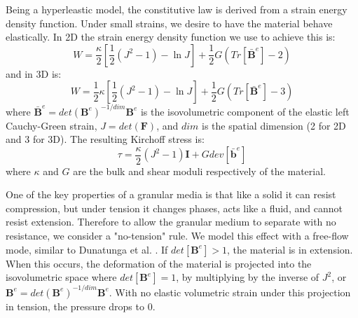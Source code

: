 Being a hyperleastic model, the constitutive law is derived from a strain energy density function.
Under small strains, we desire to have the material behave elastically. In 2D the strain energy density function we use to achieve this is:
\begin{equation}
W = \frac{\kappa}{2} \left[ \frac{1}{2} ( J^2 - 1 ) - \ln J \right] + \frac{1}{2} G ( Tr[ \bar{\bm{B}}^e ] - 2 )
\end{equation}
and in 3D is:
\begin{equation}
W = \frac{1}{2} \kappa \left[ \frac{1}{2} ( J^2 - 1 ) - \ln J \right] + \frac{1}{2} G ( Tr[ \bar{\bm{B}}^e ] - 3 )
\end{equation}
where $\bar{\bm{B}}^e = det\left( \bm{B}^e \right)^{-1/{dim}} \bm{B}^e$ is the isovolumetric component of the elastic left Cauchy-Green strain, $J = det\left( \bm{F} \right)$, and $dim$ is the spatial dimension (2 for 2D and 3 for 3D). The resulting Kirchoff stress is:
\begin{equation}
\tau = \frac{\kappa}{2} \left( J^2 - 1 \right)\bm{I} + G dev[\bar{\bm{b}}^e] \label{kirchoff_stress_hyper}
\end{equation}
where $\kappa$ and $G$ are the bulk and shear moduli respectively of the material.

One of the key properties of a granular media is that like a solid it can resist compression, but under tension it changes phases, acts like a fluid, and cannot resist extension. Therefore to allow the granular medium to separate with no resistance, we consider a "no-tension" rule. We model this effect with a free-flow mode, similar to Dunatunga et al. \cite{Dunatunga:2015:Continuum}. If $det[\bm{B}^e]>1$, the material is in extension. When this occurs, the deformation of the material is projected into the isovolumetric space where $det[\bm{B}^e]=1$, by multiplying by the inverse of $J^2$, or $\bm{B}^e=det\left( \bm{B}^e \right)^{-1/{dim}} \bm{B}^e$. With no elastic volumetric strain under this projection in tension, the pressure drops to 0.


